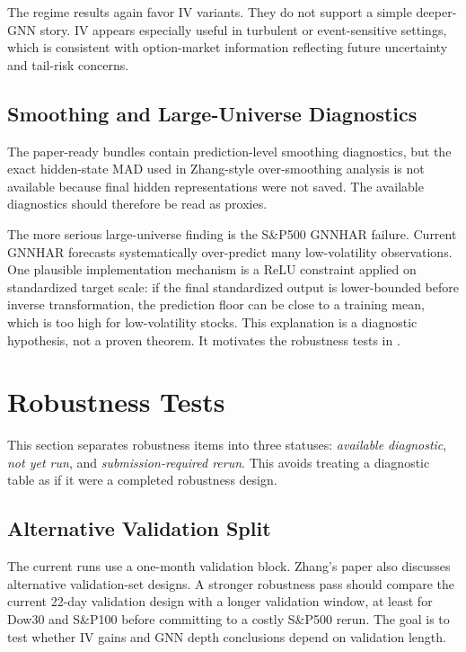 \documentclass[11pt,a4paper]{article}
\begin{document}
The regime results again favor IV variants.  They do not support a simple deeper-GNN story.  IV appears especially useful in turbulent or event-sensitive settings, which is consistent with option-market information reflecting future uncertainty and tail-risk concerns.

\subsection{Smoothing and Large-Universe Diagnostics}
\label{subsec:smoothing}

The paper-ready bundles contain prediction-level smoothing diagnostics, but the exact hidden-state MAD used in Zhang-style over-smoothing analysis is not available because final hidden representations were not saved.  The available diagnostics should therefore be read as proxies.

The more serious large-universe finding is the S\&P500 GNNHAR failure.  Current GNNHAR forecasts systematically over-predict many low-volatility observations.  One plausible implementation mechanism is a ReLU constraint applied on standardized target scale: if the final standardized output is lower-bounded before inverse transformation, the prediction floor can be close to a training mean, which is too high for low-volatility stocks.  This explanation is a diagnostic hypothesis, not a proven theorem.  It motivates the robustness tests in .

\section{Robustness Tests}
\label{sec:robustness}

This section separates robustness items into three statuses: \emph{available diagnostic}, \emph{not yet run}, and \emph{submission-required rerun}.  This avoids treating a diagnostic table as if it were a completed robustness design.

\subsection{Alternative Validation Split}
\label{subsec:validation-robust}

The current runs use a one-month validation block.  Zhang's paper also discusses alternative validation-set designs.  A stronger robustness pass should compare the current 22-day validation design with a longer validation window, at least for Dow30 and S\&P100 before committing to a costly S\&P500 rerun.  The goal is to test whether IV gains and GNN depth conclusions depend on validation length.
\end{document}
